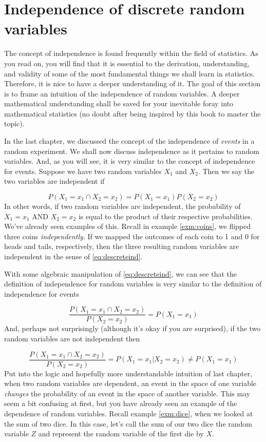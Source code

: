 \documentclass[
]{book}
\theoremstyle{definition}
\theoremstyle{definition}
\theoremstyle{definition}
\theoremstyle{definition}
\theoremstyle{remark}
\begin{document}
\section{Independence of discrete random variables}\label{independence-of-discrete-random-variables}

The concept of independence is found frequently within the field of statistics. As you read on, you will find that it is essential to the derivation, understanding, and validity of some of the most fundamental things we shall learn in statistics. Therefore, it is nice to have a deeper understanding of it. The goal of this section is to frame an intuition of the independence of random variables. A deeper mathematical understanding shall be saved for your inevitable foray into mathematical statistics (no doubt after being inspired by this book to master the topic).

In the last chapter, we discussed the concept of the independence of \emph{events} in a random experiment. We shall now discuss independence as it pertains to random variables. And, as you will see, it is very similar to the concept of independence for events. Suppose we have two random variables \(X_1\) and \(X_2\). Then we say the two variables are independent if

\[
P(X_1 = x_1 \cap X_2 = x_2) = P(X_1 = x_1)P(X_2 = x_2)
\label{eq:descreteind}
\]
In other words, if two random variables are independent, the probability of \(X_1 = x_1\) AND \(X_2 = x_2\) is equal to the product of their respective probabilities. We've already seen examples of this. Recall in example \ref{exm:coins}, we flipped three coins \emph{independently}. If we mapped the outcomes of each coin to 1 and 0 for heads and tails, respectively, then the three resulting random variables are independent in the sense of \eqref{eq:descreteind}.

With some algebraic manipulation of \eqref{eq:descreteind}, we can see that the definition of independence for random variables is very similar to the definition of independence for events

\[
\frac{P(X_1 = x_1 \cap X_2 = x_2)}{P(X_2 = x_2)}=P(X_1 = x_1)
\label{eq:descreteind2}
\]
And, perhaps not surprisingly (although it's okay if you are surprised), if the two random variables are not independent then

\[
\frac{P(X_1 = x_1 \cap X_2 = x_2)}{P(X_2 = x_2)} = P(X_1 = x_1|X_2 = x_2) \neq P(X_1 = x_1)
\]
Put into the logic and hopefully more understandable intuition of last chapter, when two random variables are dependent, an event in the space of one variable \emph{changes} the probability of an event in the space of another variable. This may seem a bit confusing at first, but you have already seen an example of the dependence of random variables. Recall example \ref{exm:dice}, when we looked at the sum of two dice. In this case, let's call the sum of our two dice the random variable \(Z\) and represent the random variable of the first die by \(X\).
\end{document}
